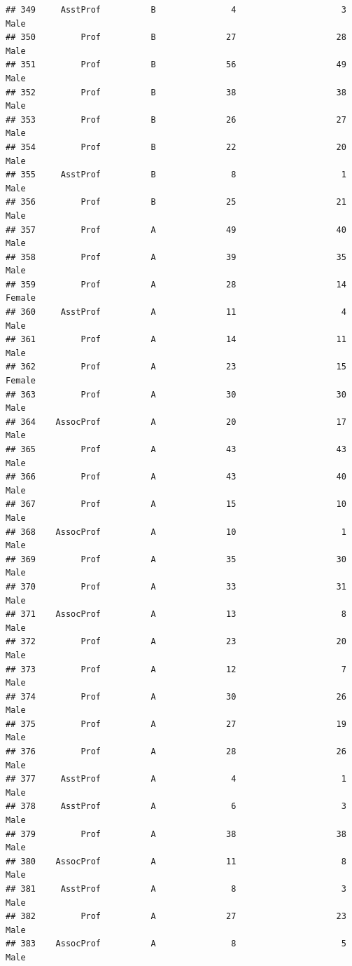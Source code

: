 \documentclass[]{article}
\begin{document}
\begin{verbatim}
## 349     AsstProf          B               4                     3   Male
## 350         Prof          B              27                    28   Male
## 351         Prof          B              56                    49   Male
## 352         Prof          B              38                    38   Male
## 353         Prof          B              26                    27   Male
## 354         Prof          B              22                    20   Male
## 355     AsstProf          B               8                     1   Male
## 356         Prof          B              25                    21   Male
## 357         Prof          A              49                    40   Male
## 358         Prof          A              39                    35   Male
## 359         Prof          A              28                    14 Female
## 360     AsstProf          A              11                     4   Male
## 361         Prof          A              14                    11   Male
## 362         Prof          A              23                    15 Female
## 363         Prof          A              30                    30   Male
## 364    AssocProf          A              20                    17   Male
## 365         Prof          A              43                    43   Male
## 366         Prof          A              43                    40   Male
## 367         Prof          A              15                    10   Male
## 368    AssocProf          A              10                     1   Male
## 369         Prof          A              35                    30   Male
## 370         Prof          A              33                    31   Male
## 371    AssocProf          A              13                     8   Male
## 372         Prof          A              23                    20   Male
## 373         Prof          A              12                     7   Male
## 374         Prof          A              30                    26   Male
## 375         Prof          A              27                    19   Male
## 376         Prof          A              28                    26   Male
## 377     AsstProf          A               4                     1   Male
## 378     AsstProf          A               6                     3   Male
## 379         Prof          A              38                    38   Male
## 380    AssocProf          A              11                     8   Male
## 381     AsstProf          A               8                     3   Male
## 382         Prof          A              27                    23   Male
## 383    AssocProf          A               8                     5   Male

\end{verbatim}
\end{document}

